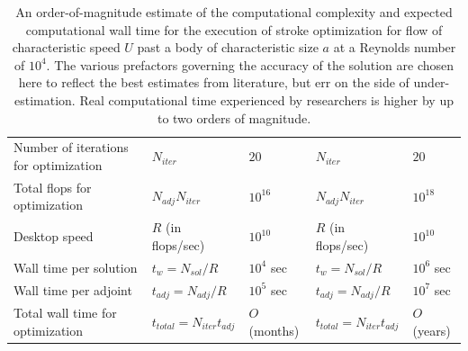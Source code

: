 \begin{table}[h]
\begin{tabular}{| p{3.5cm} | l l | l l |}
Number of iterations for optimization     &     $N_{iter}$                                            &       $20$                     &             $N_{iter} $                                    &           $20$                      \\
Total flops for optimization                       &     $N_{adj} N_{iter}$                             &       $10^{16}$            &             $N_{adj} N_{iter} $                     &           $10^{18}$             \\
Desktop speed                                           &     $R$ (in flops/sec)                              &       $10^{10}$            &              $R$ (in flops/sec)                       &          $10^{10}$              \\
Wall time per solution                               &     $t_w = N_{sol}/R$                              &       $10^4$ sec         &              $t_w = N_{sol}/R$                      &          $10^6$ sec            \\
Wall time per adjoint                                 &     $t_{adj} = N_{adj}/R$                       &        $10^5$ sec         &              $t_{adj} = N_{adj}/R$                 &          $10^7$ sec            \\
Total wall time for optimization               &     $t_{total} = N_{iter} t_{adj}$             &        $O$(months)      &              $t_{total} = N_{iter} t_{adj}$      &          $O$(years)             \\
\hline
\end{tabular}
\caption[An estimate of computational complexity of direct numerical simulation]{An order-of-magnitude estimate of the computational complexity and expected computational wall time for the execution of stroke optimization for flow of characteristic speed $U$ past a body of characteristic size $a$ at a Reynolds number of $10^4$. The various prefactors governing the accuracy of the solution are chosen here to reflect the best estimates from literature, but err on the side of under-estimation. Real computational time experienced by researchers is higher by up to two orders of magnitude.}
\label{table:DNS}
\end{table}


